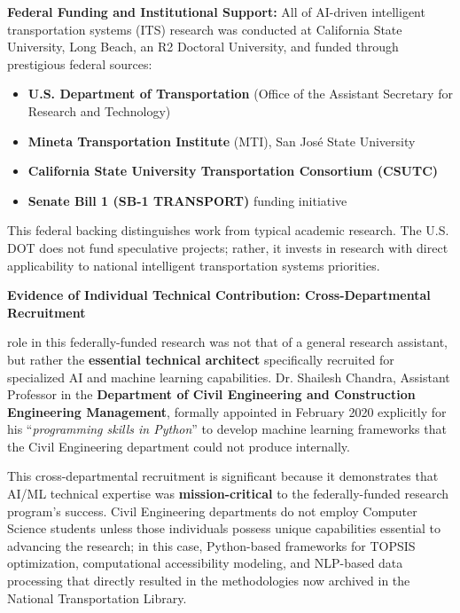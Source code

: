 \textbf{Federal Funding and Institutional Support:} All of \drs AI-driven intelligent transportation systems (ITS) research was conducted at California State University, Long Beach, an R2 Doctoral University, and funded through prestigious federal sources:

\begin{itemize}
    \item \textbf{U.S. Department of Transportation} (Office of the Assistant Secretary for Research and Technology)
    \item \textbf{Mineta Transportation Institute} (MTI), San Jos\'{e} State University
    \item \textbf{California State University Transportation Consortium (CSUTC)}
    \item \textbf{Senate Bill 1 (SB-1 TRANSPORT)} funding initiative
\end{itemize}

This federal backing distinguishes \drs work from typical academic research. The U.S. DOT does not fund speculative projects; rather, it invests in research with direct applicability to national intelligent transportation systems priorities.

\textbf{Evidence of Individual Technical Contribution: Cross-Departmental Recruitment}

\drs role in this federally-funded research was not that of a general research assistant, but rather the \textbf{essential technical architect} specifically recruited for specialized AI and machine learning capabilities. Dr. Shailesh Chandra, Assistant Professor in the \textbf{Department of Civil Engineering and Construction Engineering Management}, formally appointed \dr in February 2020 \cite{OR1B} explicitly for his ``\textit{programming skills in Python}'' to develop machine learning frameworks that the Civil Engineering department could not produce internally.

This cross-departmental recruitment is significant because it demonstrates that \drs AI/ML technical expertise was \textbf{mission-critical} to the federally-funded research program's success. Civil Engineering departments do not employ Computer Science students unless those individuals possess unique capabilities essential to advancing the research; in this case, Python-based frameworks for TOPSIS optimization, computational accessibility modeling, and NLP-based data processing that directly resulted in the methodologies now archived in the National Transportation Library.

